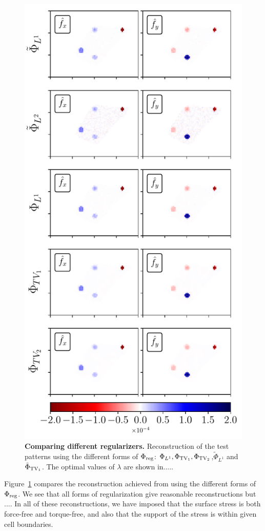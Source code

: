 \documentclass[aps,prl,reprint,twocolumn,groupedaddress,showpacs]{revtex4}
\begin{document}
\begin{figure}
\includegraphics[width=\linewidth]{fig3}
\caption{\textbf{Comparing different regularizers.} Reconstruction of the test
  patterns using the different forms of $\Phi_{\rm reg}$:
  $\Phi_{L^{1}},\Phi_{{\rm TV}_1},\Phi_{{\rm TV}_2}$,$\tilde{\Phi}_{L^{1}}$ and
  $\tilde{\Phi}_{\rm {TV}_{1}}$. The optimal values of $\lambda$ are shown
  in.....}
\label{COMPARE}
\end{figure}
%
Figure~\ref{COMPARE} compares the reconstruction achieved from using
the different forms of $\Phi_{\rm reg}$. We see that 
all forms of regularization give reasonable reconstructions but ....
%
\vspace{1cm}
%
In all of these reconstructions, we have imposed that the surface
stress is both force-free and torque-free, and also that the support
of the stress is within given cell boundaries.
\end{document}
